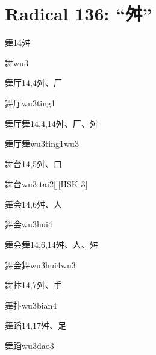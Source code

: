 
\section*{Radical 136: ``⾇''}

\begin{entry}{舞}{14}{⾇}
  \begin{phonetics}{舞}{wu3}
  \end{phonetics}
\end{entry}

\begin{entry}{舞厅}{14,4}{⾇、⼚}
  \begin{phonetics}{舞厅}{wu3ting1}
  \end{phonetics}
\end{entry}

\begin{entry}{舞厅舞}{14,4,14}{⾇、⼚、⾇}
  \begin{phonetics}{舞厅舞}{wu3ting1wu3}
  \end{phonetics}
\end{entry}

\begin{entry}{舞台}{14,5}{⾇、⼝}
  \begin{phonetics}{舞台}{wu3 tai2}[][HSK 3]
  \end{phonetics}
\end{entry}

\begin{entry}{舞会}{14,6}{⾇、⼈}
  \begin{phonetics}{舞会}{wu3hui4}
  \end{phonetics}
\end{entry}

\begin{entry}{舞会舞}{14,6,14}{⾇、⼈、⾇}
  \begin{phonetics}{舞会舞}{wu3hui4wu3}
  \end{phonetics}
\end{entry}

\begin{entry}{舞抃}{14,7}{⾇、⼿}
  \begin{phonetics}{舞抃}{wu3bian4}
  \end{phonetics}
\end{entry}

\begin{entry}{舞蹈}{14,17}{⾇、⾜}
  \begin{phonetics}{舞蹈}{wu3dao3}
  \end{phonetics}
\end{entry}


